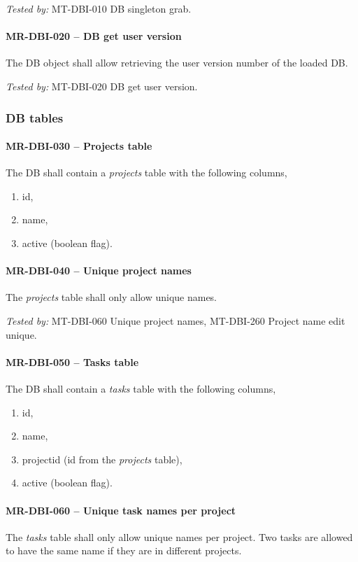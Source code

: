 \textit{Tested by: } MT-DBI-010 DB singleton grab.

\paragraph{MR-DBI-020 -- DB get user version}
The DB object shall allow retrieving the user version number of the
loaded DB.

\textit{Tested by: } MT-DBI-020 DB get user version.

\subsubsection{DB tables}
\paragraph{MR-DBI-030 -- Projects table}
The \gls{DB} shall contain a \emph{projects} table with the following columns,
\begin{enumerate}
\item id,
\item name,
\item active (boolean flag).
\end{enumerate}

\paragraph{MR-DBI-040 -- Unique project names}
The \emph{projects} table shall only allow unique names.

\textit{Tested by: } MT-DBI-060 Unique project names,
MT-DBI-260 Project name edit unique.

\paragraph{MR-DBI-050 -- Tasks table}
The \gls{DB} shall contain a \emph{tasks} table with the following columns,
\begin{enumerate}
\item id,
\item name,
\item project\textunderscore id (id from the \emph{projects} table),
\item active (boolean flag).
\end{enumerate}

\paragraph{MR-DBI-060 -- Unique task names per project}
The \emph{tasks} table shall only allow unique names per project.
Two tasks are allowed to have the same name if they are in different
projects.

